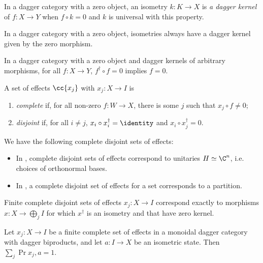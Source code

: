 \documentclass{article}
\begin{document}
\begin{definition}
  In a dagger category with a zero object, an isometry $k:K\to X$ is \emph{a dagger kernel}
  of $f:X\to Y$ when $f\circ k=0$ and $k$ is universal with this property.
\end{definition}

\begin{lemma}
  In a dagger category with a zero object, isometries always have a dagger kernel given
  by the zero morphism.
\end{lemma}

\begin{lemma}
  In a dagger category with a zero object and dagger kernels of arbitrary morphisms,
  for all $f:X\to Y$, $f^\dagger \circ f = 0$ implies $f=0$.
\end{lemma}

\begin{definition}
  A set of effects $\cc{x_j}$ with $x_j : X\to I$ is
  \begin{enumerate}
    \item \emph{complete} if, for all non-zero $f:W\to X$, there is some $j$
      such that $x_j \circ f \neq 0$;
    \item \emph{disjoint} if, for all $i\neq j$, $x_i\circ x_i^\dagger = \identity$
      and $x_i\circ x_j^\dagger = 0$.
  \end{enumerate}
\end{definition}

\begin{example}
  We have the following complete disjoint sets of effects:
  \begin{itemize}
    \item In \Hilb, complete disjoint sets of effects correspond to unitaries $H\simeq\C^n$,
      i.e. choices of orthonormal bases.
    \item In \Rel, a complete disjoint set of effects for a set corresponds to a partition.
  \end{itemize}
\end{example}

\begin{lemma}
  Finite complete disjoint sets of effects $x_j:X\to I$ correspond exactly to morphisms
  $x:X\to\bigoplus_j I$ for which $x^\dagger$ is an isometry and that have zero kernel.
\end{lemma}

\begin{proposition}
  Let $x_j:X\to I$ be a finite complete set of effects in a monoidal dagger category with
  dagger biproducts, and let $a:I\to X$ be an isometric state. Then
  $\sum_j \Pr{x_j,a}=1$.
\end{proposition}
\end{document}
